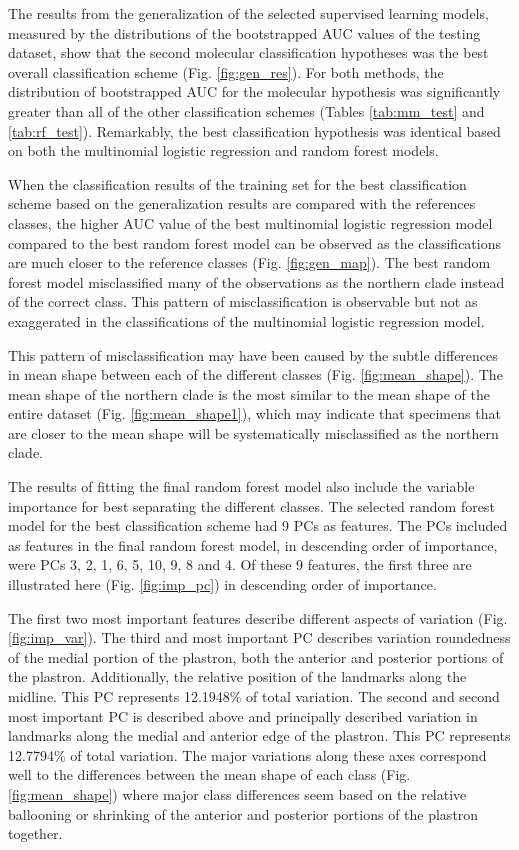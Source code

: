 \documentclass[12pt,letterpaper]{article}\usepackage{graphicx, color}
\begin{document}
The results from the generalization of the selected supervised learning models, measured by the distributions of the bootstrapped AUC values of the testing dataset, show that the second molecular classification hypotheses was the best overall classification scheme (Fig. \ref{fig:gen_res}). For both methods, the distribution of bootstrapped AUC for the molecular hypothesis was significantly greater than all of the other classification schemes (Tables \ref{tab:mm_test} and \ref{tab:rf_test}). Remarkably, the best classification hypothesis was identical based on both the multinomial logistic regression and random forest models.


When the classification results of the training set for the best classification scheme based on the generalization results are compared with the references classes, the higher AUC value of the best multinomial logistic regression model compared to the best random forest model can be observed as the classifications are much closer to the reference classes (Fig. \ref{fig:gen_map}). The best random forest model misclassified many of the observations as the northern clade instead of the correct class. This pattern of misclassification is observable but not as exaggerated in the classifications of the multinomial logistic regression model.

This pattern of misclassification may have been caused by the subtle differences in mean shape between each of the different classes (Fig. \ref{fig:mean_shape}). The mean shape of the northern clade is the most similar to the mean shape of the entire dataset (Fig. \ref{fig:mean_shape1}), which may indicate that specimens that are closer to the mean shape will be systematically misclassified as the northern clade.



The results of fitting the final random forest model also include the variable importance for best separating the different classes. The selected random forest model for the best classification scheme had 9 PCs as features. The PCs included as features in the final random forest model, in descending order of importance, were PCs 3, 2, 1, 6, 5, 10, 9, 8 and 4. Of these 9 features, the first three are illustrated here (Fig. \ref{fig:imp_pc}) in descending order of importance. 


The first two most important features describe different aspects of variation (Fig. \ref{fig:imp_var}). The third and most important PC describes variation roundedness of the medial portion of the plastron, both the anterior and posterior portions of the plastron. Additionally, the relative position of the landmarks along the midline. This PC represents 12.1948\% of total variation. The second and second most important PC is described above and principally described variation in landmarks along the medial and anterior edge of the plastron. This PC represents 12.7794\% of total variation. The major variations along these axes correspond well to the differences between the mean shape of each class (Fig. \ref{fig:mean_shape}) where major class differences seem based on the relative ballooning or shrinking of the anterior and posterior portions of the plastron together.
\end{document}
